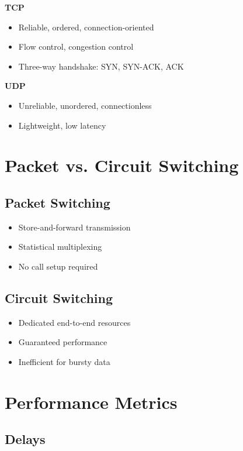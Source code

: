 \documentclass[9pt]{extarticle}
\begin{document}
\begin{multicols*}{3}
\begin{itemize}
\end{itemize}
\textbf{TCP}
\begin{itemize}
\item Reliable, ordered, connection-oriented
\item Flow control, congestion control
\item Three-way handshake: SYN, SYN-ACK, ACK
\end{itemize}
\textbf{UDP}
\begin{itemize}
\item Unreliable, unordered, connectionless
\item Lightweight, low latency
\end{itemize}
{\color{sectioncolor}\section*{\centering Packet vs. Circuit Switching}}
{\color{subsectioncolor}\subsection*{Packet Switching}}
\begin{itemize}
\item Store-and-forward transmission
\item Statistical multiplexing
\item No call setup required
\end{itemize}
{\color{subsectioncolor}\subsection*{Circuit Switching}}
\begin{itemize}
\item Dedicated end-to-end resources
\item Guaranteed performance
\item Inefficient for bursty data
\end{itemize}
{\color{sectioncolor}\section*{\centering Performance Metrics}}
{\color{subsectioncolor}\subsection*{Delays}}

\end{multicols*}
\end{document}
